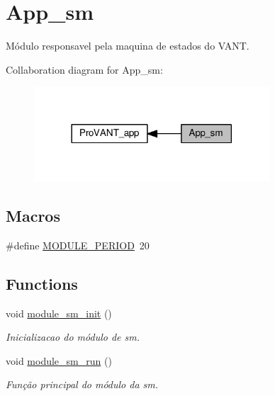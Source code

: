 \hypertarget{group__app__sm}{}\section{App\+\_\+sm}
\label{group__app__sm}


Módulo responsavel pela maquina de estados do V\+A\+NT.  


Collaboration diagram for App\+\_\+sm\+:\nopagebreak
\begin{figure}[H]
\begin{center}
\leavevmode
\includegraphics[width=249pt]{group__app__sm}
\end{center}
\end{figure}
\subsection*{Macros}
\begin{DoxyCompactItemize}
\item 
\#define \hyperlink{group__app__sm_ga0ac6c9f2991b096e49c354e5cce6fae0}{M\+O\+D\+U\+L\+E\+\_\+\+P\+E\+R\+I\+OD}~20
\end{DoxyCompactItemize}
\subsection*{Functions}
\begin{DoxyCompactItemize}
\item 
void \hyperlink{group__app__sm_gaf1b95b5ff451c9c5d9a4cdd34531201b}{module\+\_\+sm\+\_\+init} ()
\begin{DoxyCompactList}\small\item\em Inicializacao do módulo de sm. \end{DoxyCompactList}\item 
void \hyperlink{group__app__sm_ga81e54a060d460608697719ba6afab1e4}{module\+\_\+sm\+\_\+run} ()
\begin{DoxyCompactList}\small\item\em Função principal do módulo da sm. \end{DoxyCompactList}\end{DoxyCompactItemize}

